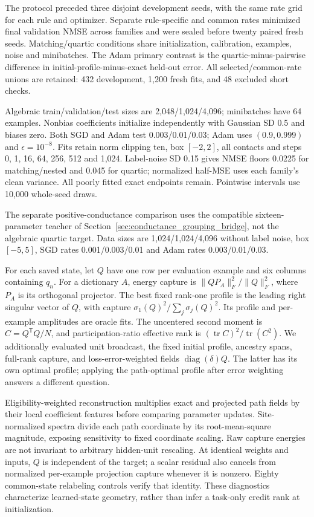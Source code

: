 The protocol preceded three disjoint development seeds, with the same rate grid for each rule and optimizer. Separate rule-specific and common rates minimized final validation NMSE across families and were sealed before twenty paired fresh seeds. Matching/quartic conditions share initialization, calibration, examples, noise and minibatches. The Adam primary contrast is the quartic-minus-pairwise difference in initial-profile-minus-exact held-out error. All selected/common-rate unions are retained: 432 development, 1,200 fresh fits, and 48 excluded short checks.

Algebraic train/validation/test sizes are 2,048/1,024/4,096; minibatches have 64 examples. Nonbias coefficients initialize independently with Gaussian SD 0.5 and biases zero. Both SGD and Adam test 0.003/0.01/0.03; Adam uses $(0.9,0.999)$ and $\epsilon=10^{-8}$. Fits retain norm clipping ten, box $[-2,2]$, all contacts and steps 0, 1, 16, 64, 256, 512 and 1,024. Label-noise SD 0.15 gives NMSE floors 0.0225 for matching/nested and 0.045 for quartic; normalized half-MSE uses each family's clean variance. All poorly fitted exact endpoints remain. Pointwise intervals use 10,000 whole-seed draws.

The separate positive-conductance comparison uses the compatible sixteen-parameter teacher of Section~\ref{sec:conductance_grouping_bridge}, not the algebraic quartic target. Data sizes are 1,024/1,024/4,096 without label noise, box $[-5,5]$, SGD rates 0.001/0.003/0.01 and Adam rates 0.003/0.01/0.03.

For each saved state, let $Q$ have one row per evaluation example and six columns containing $q_n$. For a dictionary $A$, energy capture is $\|QP_A\|_F^2/\|Q\|_F^2$, where $P_A$ is its orthogonal projector. The best fixed rank-one profile is the leading right singular vector of $Q$, with capture $\sigma_1(Q)^2/\sum_j\sigma_j(Q)^2$. Its profile and per-example amplitudes are oracle fits. The uncentered second moment is $C=Q^{\mathsf T}Q/N$, and participation-ratio effective rank is $(\operatorname{tr}C)^2/\operatorname{tr}(C^2)$. We additionally evaluated unit broadcast, the fixed initial profile, ancestry spans, full-rank capture, and loss-error-weighted fields $\operatorname{diag}(\delta)Q$. The latter has its own optimal profile; applying the path-optimal profile after error weighting answers a different question.

Eligibility-weighted reconstruction multiplies exact and projected path fields by their local coefficient features before comparing parameter updates. Site-normalized spectra divide each path coordinate by its root-mean-square magnitude, exposing sensitivity to fixed coordinate scaling. Raw capture energies are not invariant to arbitrary hidden-unit rescaling. At identical weights and inputs, $Q$ is independent of the target; a scalar residual also cancels from normalized per-example projection capture whenever it is nonzero. Eighty common-state relabeling controls verify that identity. These diagnostics characterize learned-state geometry, rather than infer a task-only credit rank at initialization.

